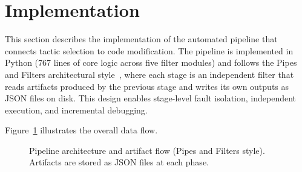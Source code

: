 \documentclass[sigconf,review,anonymous]{acmart}
\begin{document}
\FloatBarrier
\section{Implementation}
\label{sec:implementation}

This section describes the implementation of the automated pipeline that connects tactic selection to code modification. The pipeline is implemented in Python (767 lines of core logic across five filter modules) and follows the Pipes and Filters architectural style~\cite{bass2021software}, where each stage is an independent filter that reads artifacts produced by the previous stage and writes its own outputs as JSON files on disk. This design enables stage-level fault isolation, independent execution, and incremental debugging.

Figure~\ref{fig:pipeline_arch} illustrates the overall data flow.

\begin{figure}[H]
\centering
{}
\caption{Pipeline architecture and artifact flow (Pipes and Filters style). Artifacts are stored as JSON files at each phase.}
\label{fig:pipeline_arch}
\end{figure}
\end{document}
